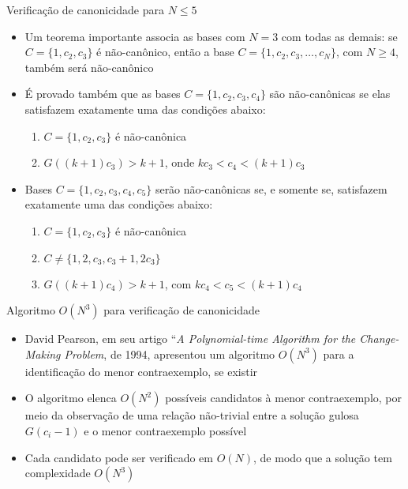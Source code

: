 \begin{frame}[fragile]{Verificação de canonicidade para $N \leq 5$}

    \begin{itemize}
        \item Um teorema importante associa as bases com $N = 3$ com todas as demais: se 
            $C = \{ 1, c_2, c_3 \}$ é não-canônico, então a base $C = \{ 1, c_2, c_3, \ldots,
                c_N \}$, com $N \geq 4$, também será não-canônico

        \item É provado também que as bases $C = \{ 1, c_2, c_3, c_4 \}$ são não-canônicas se elas
            satisfazem exatamente uma das condições abaixo:
        \begin{enumerate}
            \item $C = \{ 1, c_2, c_3 \}$ é não-canônica
            \item $G((k+1)c_3) > k + 1$, onde $kc_3 < c_4 < (k + 1)c_3$
        \end{enumerate}
        
        \item Bases $C = \{ 1, c_2, c_3, c_4, c_5 \}$ serão não-canônicas se, e somente se, 
            satisfazem exatamente uma das condições abaixo:
        \begin{enumerate}
            \item $C = \{ 1, c_2, c_3 \}$ é não-canônica
            \item $C \neq \{ 1, 2, c_3, c_3 + 1, 2c_3 \}$
            \item $G((k + 1)c_4) > k + 1$, com $kc_4 < c_5 < (k + 1)c_4$
        \end{enumerate}
    \end{itemize}

\end{frame}

\begin{frame}[fragile]{Algoritmo $O(N^3)$ para verificação de canonicidade}

    \begin{itemize}
        \item David Pearson, em seu artigo ``\textit{A Polynomial-time Algorithm for the
            Change-Making Problem}, de 1994, apresentou um algoritmo $O(N^3)$ para a identificação
            do menor contraexemplo, se existir

        \item O algoritmo elenca $O(N^2)$ possíveis candidatos à menor contraexemplo, por meio
            da observação de uma relação não-trivial entre a solução gulosa $G(c_i - 1)$ e o menor
            contraexemplo possível

        \item Cada candidato pode ser verificado em $O(N)$, de modo que a solução tem complexidade
            $O(N^3)$

    \end{itemize}

\end{frame}

